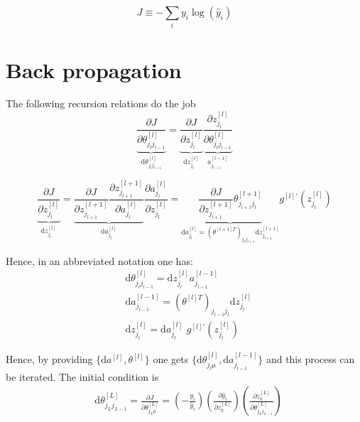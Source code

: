 \documentclass[a4paper,11pt]{article}
\newcommand{\dd}{\text{d}}
\newcommand{\na}[2]{a_{#1}^{[#2]}}
\newcommand{\nz}[2]{z_{#1}^{[#2]}}
\newcommand{\nt}[3]{\theta_{#1 #2}^{[#3]}}
\newcommand{\ff}[2]{#1 \left(#2 \right)}
\begin{document}
\begin{equation}
    J\equiv -\sum_i y_i \ff{\log}{\hat{y}_i }  
\end{equation}

\section{Back propagation}

The following recursion relations do the job
\begin{equation}
    \underbrace{
    \frac{\partial J }{\partial  \nt{j_l}{j_{l-1}}{l}  }
    }_{\dd  \nt{j_l}{j_{l-1}}{l} } 
   =
   \underbrace{
    \frac{\partial J  }{\partial \nz{j_l}{l} }
    }_{\dd  \nz{j_{l}}{l} }
    \underbrace{
    \frac{\partial \nz{j_l}{l} }{\partial \nt{j_l}{j_{l-1}}{l}  }
    }_{ \na{j_{l-1}}{l-1} }
\end{equation}



\begin{equation}
\underbrace{
\frac{\partial J  }{\partial \nz{j_l}{l}   }
}_{\dd  \nz{j_{l}}{l} }
	=
	\underbrace{ 
	\frac{\partial J  }{\partial \nz{j_{l+1}}{l+1}   } 
	\frac{\partial \nz{j_{l+1}}{l+1}   }{ \partial \na{j_{l}}{l}  }
	}_{\dd a_{j_l}^{[l]} }
	\frac{\partial \na{j_{l}}{l}    }{ \partial \nz{j_{l}}{l}  }
	=
	\underbrace{
	\frac{\partial J  }{\partial \nz{j_{l+1}}{l+1}   } 
	 \nt{j_{l+1}}{j_l}{l+1}
	 }_{ \dd a_{j_l}^{[l]}=(\theta^{[l+1]T})_{j_l j_{l+1}} \dd z_{j_{l+1}}^{[l+1]} }
	 g^{[l]'}\left( z_{j_{l}}^{[l]}   \right)
\end{equation}

Hence, in an abbreviated notation one has:
\begin{eqnarray}
	&\dd  \nt{j_l}{j_{l-1}}{l} = \dd  \nz{j_{l}}{l}  \na{j_{l-1}}{l-1}\\
	&\dd a_{j_{l-1}}^{[l-1]}=(\theta^{[l]T})_{j_{l-1} j_{l}} \dd z_{j_{l}}^{[l]}\\
	&\dd  \nz{j_{l}}{l}= \dd a_{j_l}^{[l]} \,\, g^{[l]'}\left( z_{j_{l}}^{[l]}   \right)
\end{eqnarray}

Hence, by providing $\{ \dd a^{[l]}  , \theta^{[l]}\}$ one gets $\{ \dd  \nt{j_l}{\mu}{l}, \dd a_{j_{l-1}}^{[l-1]}\}$ and this process can be iterated. 
The initial condition is
\begin{eqnarray}
    &\dd \theta^{[L]}_{j_L j_{L-1}}= \frac{\partial J }{\partial  \nt{j_L}{\mu}{L}  } =
   \left( -  \frac{y_i }{ \hat{y}_i} \right)
   \left(  \frac{ \partial \hat{y}_i}{\partial z_k^{[L]} }    \right)
   \left(   \frac{ \partial z_k^{[L]} } {\partial  \nt{j_L}{j_{L-1}}{L}  }  \right) 
\end{eqnarray}
\end{document}
